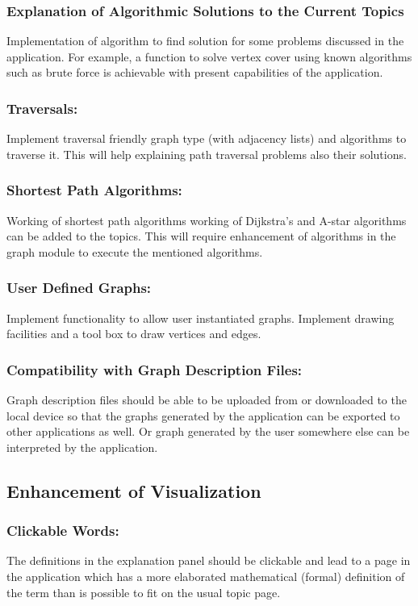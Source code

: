 \subsubsection{Explanation of Algorithmic Solutions to the Current Topics} 
Implementation of algorithm to find solution for some problems discussed in the
application. For example, a function to solve vertex cover using known
algorithms such as brute force is achievable with present capabilities of the
application.

\subsubsection{Traversals:} Implement traversal friendly graph type (with
adjacency lists) and algorithms to traverse it. This will help explaining
path traversal problems also their solutions.


\subsubsection{Shortest Path Algorithms:} Working of shortest path algorithms
working of Dijkstra's and A-star algorithms can be added to the topics. This
will require enhancement of algorithms in the graph module to execute the
mentioned algorithms.

\subsubsection{User Defined Graphs:} Implement functionality to allow user
instantiated graphs. Implement drawing facilities and a tool box to draw
vertices and edges.

\subsubsection{Compatibility with Graph Description Files:} Graph description files
should be able to be uploaded from or downloaded to the local device so that
the graphs generated by the application can be exported to other applications
as well. Or graph generated by the user somewhere else can be interpreted by
the application.

\subsection{Enhancement of Visualization}

\subsubsection{Clickable Words:} The definitions in the explanation panel
should be clickable and lead to a page in the application which has a more
elaborated mathematical (formal) definition of the term than is possible to fit
on the usual topic page.

